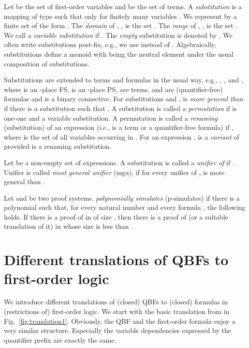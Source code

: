 \documentclass{llncs}
\begin{document}
Let  be the set of first-order variables and  be the set of
terms.  A \emph{substitution} is a mapping  of type
 such that  only for finitely many
variables .  We represent  by a finite set of the form
.  The
\emph{domain} of 
, , is the set
. The \emph{range} of ,
, is the set . We call  a \emph{variable substitution} if
.  The \emph{empty} substitution
 is denoted by . We often write substitutions
post-fix, e.g., we use  instead of .
Algebraically, substitutions define a monoid with  being the
neutral element under the usual composition of substitutions.

Substitutions are extended to terms and formulas in the usual way,
e.g., ,
, and , where 
is an -place FS,  is an -place PS,  are
terms,  and  are (quantifier-free) formulas and  is a
binary connective.  For substitutions  and ,  is
\emph{more general than}  if there is a substitution  such
that .
A substitution  is called a \emph{permutation} if  is
one-one and a variable substitution. A permutation  is called
a \emph{renaming} (substitution) of an expression  (i.e.,  is a
term or a quantifier-free formula) if , where  is the set of all variables occurring in .
For an expression ,  is a \emph{variant} of  provided
 is a renaming substitution.

Let  be a non-empty set of expressions. A
substitution  is called a \emph{unifier of } if
. Unifier  is
called \emph{most general unifier} (mgu), if for every unifier 
of ,  is more general than .

Let  and  be two proof systems.  
\emph{polynomially simulates} (p-simulates)  if there is a
polynomial  such that, for every natural number  and every
formula , the following holds. If there is a proof of
 in  of size , then there is a proof of  (or
a suitable translation of it) in  whose size is less than .

\section{Different translations of QBFs to first-order logic}
\label{sec:diff-trans}


We introduce different translations of (closed) QBFs to (closed)
formulas in (restrictions of) first-order logic.  We start with the
basic translation from \cite{DBLP:conf/cade/SeidlLB12} in
Fig.~\ref{fig:translation1}.  Obviously, the QBF  and the
first-order formula  enjoy a very similar
structure. Especially the variable dependencies expressed by the
quantifier prefix are exactly the same.
\end{document}
